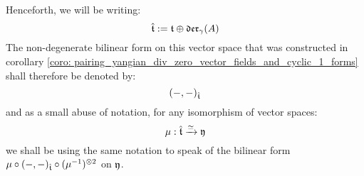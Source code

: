         \begin{convention}
            Henceforth, we will be writing:
                $$\hat{\mathfrak{t}} := \mathfrak{t} \oplus \mathfrak{der}_{\gamma}(A)$$
            The non-degenerate bilinear form on this vector space that was constructed in corollary \ref{coro: pairing_yangian_div_zero_vector_fields_and_cyclic_1_forms} shall therefore be denoted by:
                $$(-, -)_{\hat{\mathfrak{t}}}$$
            and as a small abuse of notation, for any isomorphism of vector spaces:
                $$\mu: \hat{\mathfrak{t}} \xrightarrow[]{\simeq} \mathfrak{y}$$
            we shall be using the same notation to speak of the bilinear form $\mu \circ (-, -)_{\extendedtoroidal} \circ (\mu^{-1})^{\tensor 2}$ on $\mathfrak{y}$. 
        \end{convention}

